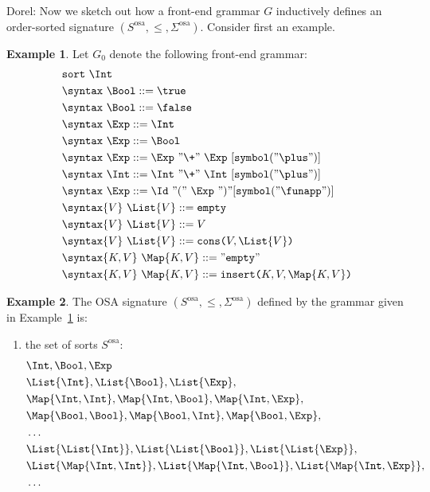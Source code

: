 \documentclass{article}
\newcommand\comment[2]{\par\noindent\color{red}#1: #2\color{black}\par\noindent}
\newcommand\dl{\comment{Dorel}}
\theoremstyle{definition}
\newtheorem{example}{Example}[section]
\theoremstyle{definition}
\theoremstyle{definition}
\theoremstyle{definition}
\theoremstyle{definition}
\theoremstyle{theorem}
\theoremstyle{theorem}
\theoremstyle{theorem}
\theoremstyle{theorem}
\theoremstyle{theorem}
\newcommand{\KWsymbol}{\texttt{symbol}}
\newcommand{\sort}{\texttt{sort}}
\begin{document}
\dl{
Now we sketch out how a front-end grammar $G$ inductively defines an order-sorted signature $(S^\textrm{osa},\le, \Sigma^\textrm{osa})$. Consider first an example.


\begin{example}\label{ex:front-end-grammar}
Let $G_0$ denote the following front-end grammar:
\begin{align*}
&\sort\ \Int\\
&\syntax\ \Bool ::= \true\\
&\syntax\ \Bool ::= \false\\
&\syntax\ \Exp ::= \Int\\
&\syntax\ \Exp ::= \Bool\\
&\syntax\ \Exp ::= \Exp\ "\+"\ \Exp\ [\KWsymbol("\plus")]\\
&\syntax\ \Int ::= \Int\ "\+"\ \Int\ [\KWsymbol("\plus")]\\
&\syntax\ \Exp ::= \Id\ "("\ \Exp\ ")" [\KWsymbol("\funapp")]\\
&\syntax\{V\}\ \List{V} ::= \texttt{empty}\\
&\syntax\{V\}\ \List{V} ::= V\\
&\syntax\{V\}\ \List{V} ::= \texttt{cons(}V,\List{V}\texttt{)}\\
&\syntax\{K,V\}\ \Map{K,V} ::= "\texttt{empty}"\\
&\syntax\{K,V\}\ \Map{K, V} ::= \texttt{insert(}K, V, \Map{K, V}\texttt{)}
\end{align*}
\end{example}
\begin{example}
The OSA signature $(S^\textrm{osa},\le, \Sigma^\textrm{osa})$ defined by the grammar given in Example~\ref{ex:front-end-grammar} is:
\begin{enumerate}
\item the set of sorts $S^\textrm{osa}$:
\begin{align*}
&\Int, \Bool,\Exp\\
&\List{\Int}, \List{\Bool},\List{\Exp},\\
&\Map{\Int,\Int}, \Map{\Int,\Bool}, \Map{\Int,\Exp},\\ 
&\Map{\Bool,\Bool},\Map{\Bool,\Int},  \Map{\Bool,\Exp}, \\
&\ldots\\
&\List{\List{\Int}}, \List{\List{\Bool}},\List{\List{\Exp}},\\
&\List{\Map{\Int,\Int}}, \List{\Map{\Int,\Bool}}, \List{\Map{\Int,\Exp}},\\ 
&\ldots\\

\end{align*}
\end{enumerate}
\end{example}}
\end{document}
